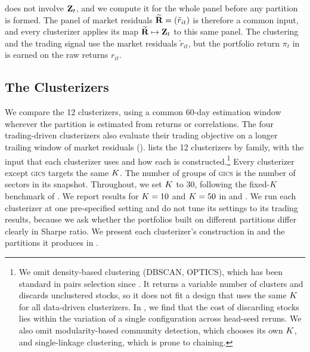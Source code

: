  does not involve $\mathbf{Z}_t$, and we compute it
for the whole panel before any partition is formed. The panel of market residuals $\widetilde{\mathbf{R}} = (\tilde r_{it})$ is therefore a common input, and every
clusterizer applies its map $\widetilde{\mathbf{R}} \mapsto \mathbf{Z}_t$
to this same panel. The clustering and the trading signal use the market residuals $\tilde r_{it}$, but the portfolio return $\pi_t$ in  is earned on the raw returns $r_{it}$.


\subsection{The Clusterizers}
\label{sec:methods}

We compare the 12 clusterizers, using a common 60-day estimation window wherever the partition is estimated from returns or correlations. The four trading-driven clusterizers also evaluate their trading objective on a longer trailing window of market residuals ().
 lists the 12 clusterizers by
family, with the input that each clusterizer uses and how each is
constructed.\footnote{We omit density-based clustering (DBSCAN, OPTICS), which has been standard in pairs selection since \citet{SARMENTO2020113490}. It returns a variable number of clusters and discards unclustered stocks, so it does not fit a design that uses the same $K$ for all data-driven clusterizers. In , we find that the cost of discarding stocks lies within the variation of a single configuration across head-seed reruns. We also omit modularity-based community detection, which chooses its own $K$, and single-linkage clustering, which is prone to chaining.}  Every clusterizer except \textsc{gics} targets the same $K$. The number of groups of \textsc{gics} is the number of sectors in its snapshot. Throughout, we set $K$ to $30$, following the fixed-$K$ benchmark of \citet{Jinetal2023}. We report results for $K = 10$ and $K = 50$ in  and . We run each clusterizer at one pre-specified setting and do not tune its settings to its trading results,
because we ask whether the portfolios built on different partitions differ clearly in Sharpe ratio. We present each clusterizer's construction in  and the partitions it produces in .

